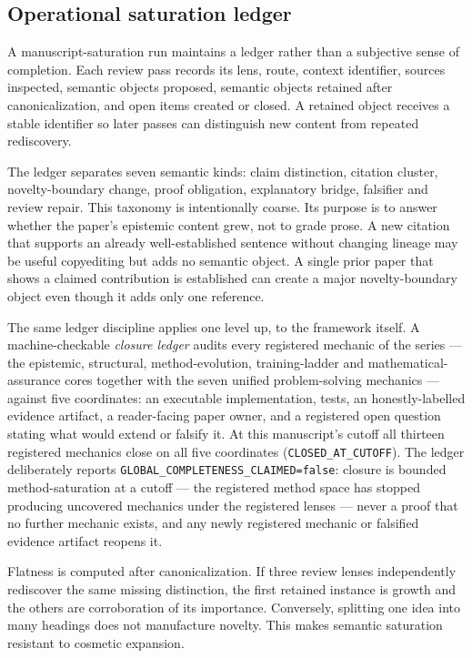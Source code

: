 \subsection{Operational saturation ledger}

A manuscript-saturation run maintains a ledger rather than a subjective sense of completion. Each review pass records its lens, route, context identifier, sources inspected, semantic objects proposed, semantic objects retained after canonicalization, and open items created or closed. A retained object receives a stable identifier so later passes can distinguish new content from repeated rediscovery.

The ledger separates seven semantic kinds: claim distinction, citation cluster, novelty-boundary change, proof obligation, explanatory bridge, falsifier and review repair. This taxonomy is intentionally coarse. Its purpose is to answer whether the paper's epistemic content grew, not to grade prose. A new citation that supports an already well-established sentence without changing lineage may be useful copyediting but adds no semantic object. A single prior paper that shows a claimed contribution is established can create a major novelty-boundary object even though it adds only one reference.

The same ledger discipline applies one level up, to the framework itself. A machine-checkable \emph{closure ledger} audits every registered mechanic of the series --- the epistemic, structural, method-evolution, training-ladder and mathematical-assurance cores together with the seven unified problem-solving mechanics --- against five coordinates: an executable implementation, tests, an honestly-labelled evidence artifact, a reader-facing paper owner, and a registered open question stating what would extend or falsify it. At this manuscript's cutoff all thirteen registered mechanics close on all five coordinates (\texttt{CLOSED\_AT\_CUTOFF}). The ledger deliberately reports \texttt{GLOBAL\_COMPLETENESS\_CLAIMED=false}: closure is bounded method-saturation at a cutoff --- the registered method space has stopped producing uncovered mechanics under the registered lenses --- never a proof that no further mechanic exists, and any newly registered mechanic or falsified evidence artifact reopens it.

Flatness is computed after canonicalization. If three review lenses independently rediscover the same missing distinction, the first retained instance is growth and the others are corroboration of its importance. Conversely, splitting one idea into many headings does not manufacture novelty. This makes semantic saturation resistant to cosmetic expansion.

